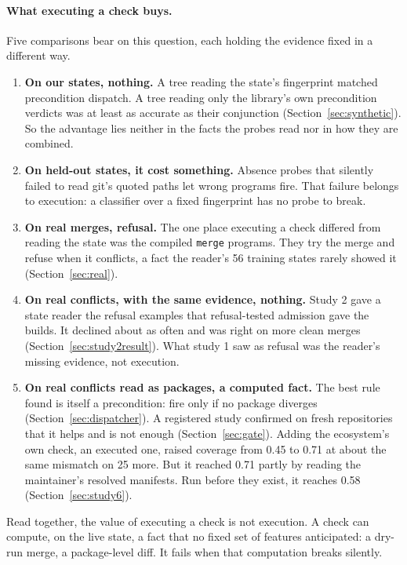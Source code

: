 \documentclass[11pt]{article}
\newcommand{\code}[1]{\texttt{#1}}
\begin{document}
\paragraph{What executing a check buys.}
Five comparisons bear on this question, each holding the evidence fixed in a different way.
\begin{enumerate}
  \item \textbf{On our states, nothing.} A tree reading the state's fingerprint matched
  precondition dispatch. A tree reading only the library's own precondition verdicts was at least
  as accurate as their conjunction (Section~\ref{sec:synthetic}). So the advantage lies neither
  in the facts the probes read nor in how they are combined.
  \item \textbf{On held-out states, it cost something.} Absence probes that silently failed to
  read git's quoted paths let wrong programs fire. That failure belongs to execution: a
  classifier over a fixed fingerprint has no probe to break.
  \item \textbf{On real merges, refusal.} The one place executing a check differed from reading
  the state was the compiled \code{merge} programs. They try the merge and refuse when it
  conflicts, a fact the reader's 56 training states rarely showed it (Section~\ref{sec:real}).
  \item \textbf{On real conflicts, with the same evidence, nothing.} Study 2 gave a state reader
  the refusal examples that refusal-tested admission gave the builds. It declined about as often
  and was right on more clean merges (Section~\ref{sec:study2result}). What study 1 saw as
  refusal was the reader's missing evidence, not execution.
  \item \textbf{On real conflicts read as packages, a computed fact.} The best rule found is
  itself a precondition: fire only if no package diverges (Section~\ref{sec:dispatcher}). A
  registered study confirmed on fresh repositories that it helps and is not enough
  (Section~\ref{sec:gate}). Adding the ecosystem's own check, an executed one, raised coverage
  from 0.45 to 0.71 at about the same mismatch on 25 more. But it reached 0.71 partly by reading
  the maintainer's resolved manifests. Run before they exist, it reaches 0.58
  (Section~\ref{sec:study6}).
\end{enumerate}
Read together, the value of executing a check is not execution. A check can compute, on the live
state, a fact that no fixed set of features anticipated: a dry-run merge, a package-level diff.
It fails when that computation breaks silently.
\end{document}
